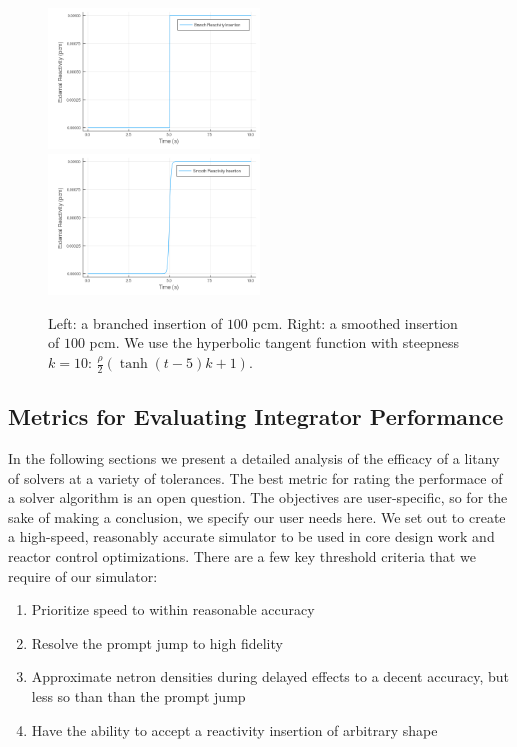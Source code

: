 \documentclass[review,onefignum,onetabnum]{siamart171218}
\begin{document}
\begin{figure}[htb]
  \includegraphics[width=0.5\textwidth]{../plots/insertion-plots/branch.png}
  \includegraphics[width=0.5\textwidth]{../plots/insertion-plots/smooth.png}
  \caption{Left: a branched insertion of $100$ pcm. Right: a smoothed insertion of $100$ pcm. We
  use the hyperbolic tangent function with steepness $k=10$: $\frac{\rho}{2}(\tanh{(t - 5)k} + 1)$.}
  \label{fig:branch-smooth}
\end{figure}

\subsection{Metrics for Evaluating Integrator Performance}
In the following sections we present a detailed analysis of the efficacy of a litany of solvers
at a variety of tolerances. The best metric for rating the performace of a solver algorithm
is an open question. The objectives are user-specific, so for the sake of making a
conclusion, we specify our user needs here. We set out to create a high-speed,
reasonably accurate simulator to be used in core design work and reactor control
optimizations. There are a few key threshold criteria that we require of our simulator:\\

\begin{enumerate}
  \item Prioritize speed to within reasonable accuracy
  \item Resolve the prompt jump to high fidelity %
  \item Approximate netron densities during delayed effects to a decent accuracy, but less
  so than than the prompt jump %
  \item Have the ability to accept a reactivity insertion of arbitrary shape
\end{enumerate}
\end{document}
